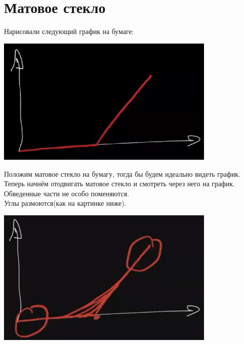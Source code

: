 \documentclass{article}
\begin{document}
\section{Матовое стекло}
Нарисовали следующий график на бумаге:
\begin{center}  
\includegraphics[width=300pt]{picture_5.png}\\
\end{center}  
Положим матовое стекло на бумагу, тогда бы будем идеально видеть график.\\
Теперь начнём отодвигать матовое стекло и смотреть через него на график. \\
Обведенные части не особо поменяются.\\
Углы размоются(как на картинке ниже).\\
\begin{center}  
\includegraphics[width=300pt]{picture_6.png}\\
\end{center}  
\end{document}

